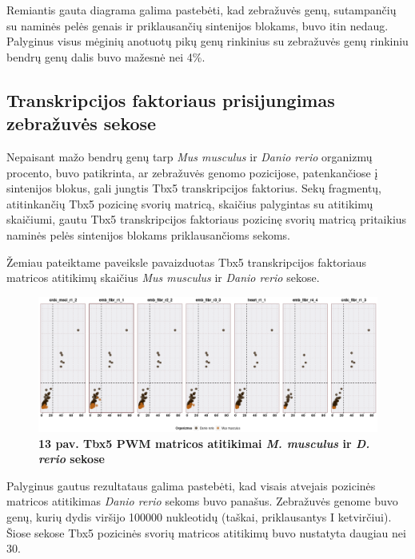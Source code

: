 \documentclass[12pt]{article}
\begin{document}
Remiantis gauta diagrama galima pastebėti, kad zebražuvės genų, sutampančių su
naminės pelės genais ir priklausančių sintenijos blokams, buvo itin nedaug.
Palyginus visus mėginių anotuotų pikų genų rinkinius su zebražuvės genų rinkiniu
bendrų genų dalis buvo mažesnė nei 4\%.

\newpage

\subsection{Transkripcijos faktoriaus prisijungimas zebražuvės sekose}
Nepaisant mažo bendrų genų tarp \emph{Mus musculus} ir \emph{Danio rerio}
organizmų procento, buvo patikrinta, ar zebražuvės genomo pozicijose,
patenkančiose į sintenijos blokus, gali jungtis Tbx5 transkripcijos faktorius.
Sekų fragmentų, atitinkančių Tbx5 pozicinę svorių matricą, skaičius palygintas
su atitikimų skaičiumi, gautu Tbx5 transkripcijos faktoriaus pozicinę svorių
matricą pritaikius naminės pelės sintenijos blokams priklausančioms sekoms.

Žemiau pateiktame paveiksle pavaizduotas Tbx5 transkripcijos faktoriaus matricos
atitikimų skaičius \emph{Mus musculus} ir \emph{Danio rerio} sekose.

\begin{figure}[htb]
    \begin{center}
        \includegraphics[width=1\linewidth]{../Figures/PWM_matches_all.png}
        \vspace{-2\baselineskip}
        \caption*{\small\textbf{13 pav. Tbx5 PWM matricos atitikimai
        \emph{M. musculus} ir \emph{D. rerio} sekose}}
        \label{fig:13}
    \end{center}
\end{figure}

Palyginus gautus rezultataus galima pastebėti, kad visais atvejais pozicinės
matricos atitikimas \emph{Danio rerio} sekoms buvo panašus. Zebražuvės genome
buvo genų, kurių dydis viršijo 100000 nukleotidų (taškai, priklausantys I
ketvirčiui). Šiose sekose Tbx5 pozicinės svorių matricos atitikimų buvo
nustatyta daugiau nei 30.
\end{document}
